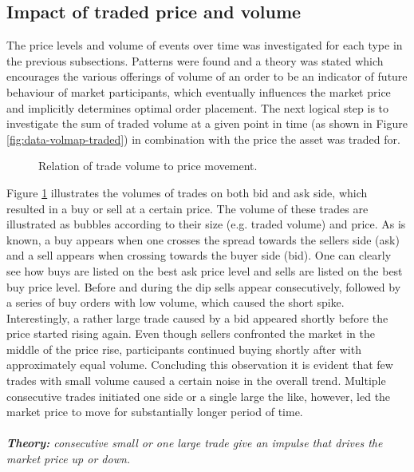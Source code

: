\subsection{Impact of traded price and volume}

The price levels and volume of events over time was investigated for each type in the previous subsections.
Patterns were found and a theory was stated which encourages the various offerings of volume of an order to be an indicator of future behaviour of market participants, which eventually influences the market price and implicitly determines optimal order placement.
The next logical step is to investigate the sum of traded volume at a given point in time (as shown in Figure \ref{fig:data-volmap-traded}) in combination with the price the asset was traded for.

\begin{figure}[H]
    \centering
    \caption{Relation of trade volume to price movement.}
    \label{fig:data-trade-volume}
\end{figure}

Figure \ref{fig:data-trade-volume} illustrates the volumes of trades on both bid and ask side, which resulted in a buy or sell at a certain price.
The volume of these trades are illustrated as bubbles according to their size (e.g. traded volume) and price.
As is known, a buy appears when one crosses the spread towards the sellers side (ask) and a sell appears when crossing towards the buyer side (bid).
One can clearly see how buys are listed on the best ask price level and sells are listed on the best buy price level.
Before and during the dip sells appear consecutively, followed by a series of buy orders with low volume, which caused the short spike.
Interestingly, a rather large trade caused by a bid appeared shortly before the price started rising again.
Even though sellers confronted the market in the middle of the price rise, participants continued buying shortly after with approximately equal volume.
Concluding this observation it is evident that few trades with small volume caused a certain noise in the overall trend.
Multiple consecutive trades initiated one side or a single large the like, however, led the market price to move for substantially longer period of time.
\\
\\
\textit{\textbf{Theory:} consecutive small or one large trade give an impulse that drives the market price up or down.}

